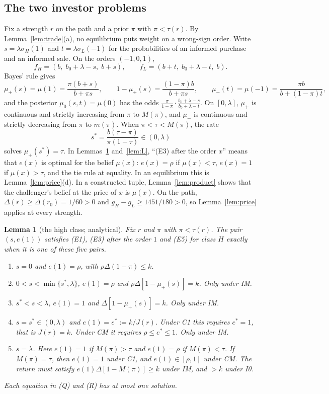 \documentclass[11pt]{article}
\newtheorem{lemma}{Lemma}
\theoremstyle{definition}
\begin{document}
\subsection{The two investor problems}

Fix a strength $r$ on the path and a prior $\pi$ with $\pi<\tau(r)$. By Lemma~\ref{lem:trade}(a), no equilibrium
puts weight on a wrong-sign order. Write $s=\lambda\sigma_H(1)$ and $t=\lambda\sigma_L(-1)$ for the probabilities
of an informed purchase and an informed sale. On the orders $(-1,0,1)$,
\[
f_H=(b,\;b_0+\lambda-s,\;b+s),\qquad f_L=(b+t,\;b_0+\lambda-t,\;b).
\]
Bayes' rule gives
\[
\mu_+(s)=\mu(1)=\frac{\pi(b+s)}{b+\pi s},\qquad 1-\mu_+(s)=\frac{(1-\pi)b}{b+\pi s},\qquad
\mu_-(t)=\mu(-1)=\frac{\pi b}{b+(1-\pi)t},
\]
and the posterior $\mu_0(s,t)=\mu(0)$ has the odds $\frac{\pi}{1-\pi}\cdot\frac{b_0+\lambda-s}{b_0+\lambda-t}$.
On $[0,\lambda]$, $\mu_+$ is continuous and strictly increasing from $\pi$ to $M(\pi)$, and $\mu_-$ is continuous
and strictly decreasing from $\pi$ to $m(\pi)$. When $\pi<\tau<M(\pi)$, the rate
\[
s^*=\frac{b(\tau-\pi)}{\pi(1-\tau)}\in(0,\lambda)
\]
solves $\mu_+(s^*)=\tau$. In Lemmas~\ref{lem:H} and~\ref{lem:L}, ``(E3) after the order $x$'' means that $e(x)$ is
optimal for the belief $\mu(x)$: $e(x)=\rho$ if $\mu(x)<\tau$, $e(x)=1$ if $\mu(x)>\tau$, and the tie rule at
equality. In an equilibrium this is Lemma~\ref{lem:price}(d). In a constructed tuple, Lemma~\ref{lem:product} shows
that the challenger's belief at the price of $x$ is $\mu(x)$. On the path, $\Delta(r)\ge\Delta(r_0)=1/60>0$ and
$g_H-g_L\ge1451/180>0$, so Lemma~\ref{lem:price} applies at every strength.

\begin{lemma}[the high class; analytical]\label{lem:H}
Fix $r$ and $\pi$ with $\pi<\tau(r)$. The pair $(s,e(1))$ satisfies (E1), (E3) after the order $1$ and (E5) for
class $H$ exactly when it is one of these five pairs.
\begin{enumerate}[label=(\Alph*)]
\item[(N)] $s=0$ and $e(1)=\rho$, with $\rho\Delta(1-\pi)\le k$.
\item[(Q)] $0<s<\min\{s^*,\lambda\}$, $e(1)=\rho$ and $\rho\Delta[1-\mu_+(s)]=k$. Only under IM.
\item[(R)] $s^*<s<\lambda$, $e(1)=1$ and $\Delta[1-\mu_+(s)]=k$. Only under IM.
\item[(T)] $s=s^*\in(0,\lambda)$ and $e(1)=e^*:=k/J(r)$. Under C1 this requires $e^*=1$, that is $J(r)=k$.
  Under CM it requires $\rho\le e^*\le1$. Only under IM.
\item[(F)] $s=\lambda$. Here $e(1)=1$ if $M(\pi)>\tau$ and $e(1)=\rho$ if $M(\pi)<\tau$. If $M(\pi)=\tau$,
  then $e(1)=1$ under C1, and $e(1)\in[\rho,1]$ under CM. The return must satisfy $e(1)\Delta[1-M(\pi)]\ge k$
  under IM, and $>k$ under I0.
\end{enumerate}
Each equation in (Q) and (R) has at most one solution.
\end{lemma}
\end{document}
